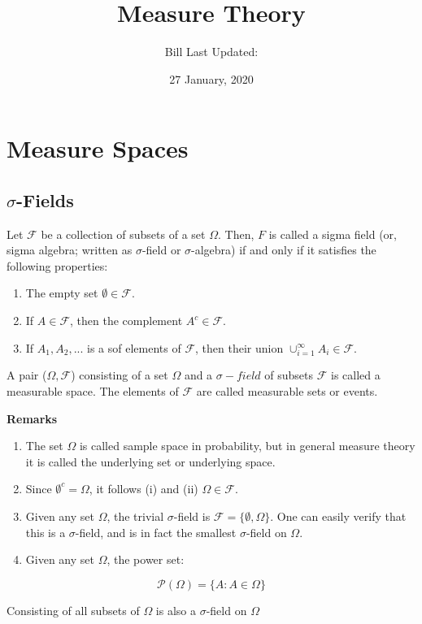 \documentclass[]{book}
\title{Measure Theory}
\author{Bill Last Updated:}
\date{27 January, 2020}
\begin{document}
\maketitle

{
\setcounter{tocdepth}{1}
\tableofcontents
}
\hypertarget{measure-spaces}{%
\chapter{Measure Spaces}\label{measure-spaces}}

\hypertarget{sigma-fields}{%
\section{\texorpdfstring{\(\sigma\)-Fields}{\textbackslash{}sigma-Fields}}\label{sigma-fields}}

Let \(\mathcal{F}\) be a collection of subsets of a set \(\Omega\). Then, \(F\) is called a sigma field (or, sigma algebra; written as \(\sigma\)-field or \(\sigma\)-algebra) if and only if it satisfies the following properties:

\begin{enumerate}
\def\labelenumi{(\roman{enumi})}
\item
  The empty set \(\emptyset \in \mathcal{F}\).
\item
  If \(A \in \mathcal{F}\), then the complement \(A^c \in \mathcal{F}\).
\item
  If \(A_1, A_2,...\) is a sof elements of \(\mathcal{F}\), then their union \(\cup_{i=1}^\infty A_i \in \mathcal{F}\).
\end{enumerate}

A pair (\(\Omega, \mathcal{F}\)) consisting of a set \(\Omega\) and a \(\sigma-field\) of subsets \(\mathcal{F}\) is called a measurable space. The elements of \(\mathcal{F}\) are called measurable sets or events.

\textbf{Remarks}

\begin{enumerate}
\def\labelenumi{(\arabic{enumi})}
\item
  The set \(\Omega\) is called sample space in probability, but in general measure theory it is called the underlying set or underlying space.
\item
  Since \(\emptyset^c=\Omega\), it follows (i) and (ii) \(\Omega \in \mathcal{F}\).
\item
  Given any set \(\Omega\), the trivial \(\sigma\)-field is \(\mathcal{F}=\{ \emptyset, \Omega\}\). One can easily verify that this is a \(\sigma\)-field, and is in fact the smallest \(\sigma\)-field on \(\Omega\).
\item
  Given any set \(\Omega\), the power set:
\end{enumerate}

\[\mathcal{P}(\Omega)=\{A: A \in \Omega\}\]

Consisting of all subsets of \(\Omega\) is also a \(\sigma\)-field on \(\Omega\)


\end{document}
